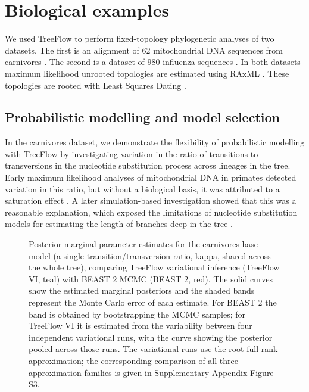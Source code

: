 \section{Biological examples}

We used TreeFlow to perform fixed-topology phylogenetic analyses of two datasets. The first is an alignment of 62 mitochondrial DNA sequences from carnivores \cite{suchard2009many}. The second is a dataset of 980 influenza sequences \cite{vaughan2014efficient}. In both datasets maximum likelihood unrooted topologies are estimated using RAxML \cite{stamatakis2014raxml}. These topologies are rooted with Least Squares Dating \cite{to2016lsd}.

\subsection{Probabilistic modelling and model selection}

In the carnivores dataset, we demonstrate the flexibility of probabilistic modelling with TreeFlow by investigating variation in the ratio of transitions to transversions in the nucleotide substitution process across lineages in the tree. Early maximum likelihood analyses of mitochondrial DNA in primates detected variation in this ratio, but without a biological basis, it was attributed to a saturation effect \cite{yang1999estimation}. A later simulation-based investigation showed that this was a reasonable explanation, which exposed the limitations of nucleotide substitution models for estimating the length of branches deep in the tree \cite{duchene2015declining}.

\begin{figure}
    \centering
    \caption{Posterior marginal parameter estimates for the carnivores base model (a single transition/transversion ratio, kappa, shared across the whole tree), comparing TreeFlow variational inference (TreeFlow VI, teal) with BEAST 2 MCMC (BEAST 2, red). The solid curves show the estimated marginal posteriors and the shaded bands represent the Monte Carlo error of each estimate. For BEAST 2 the band is obtained by bootstrapping the MCMC samples; for TreeFlow VI it is estimated from the variability between four independent variational runs, with the curve showing the posterior pooled across those runs. The variational runs use the root full rank approximation; the corresponding comparison of all three approximation families is given in Supplementary Appendix Figure S3.}
    \label{fig:carnivoresmarginals}
\end{figure}

